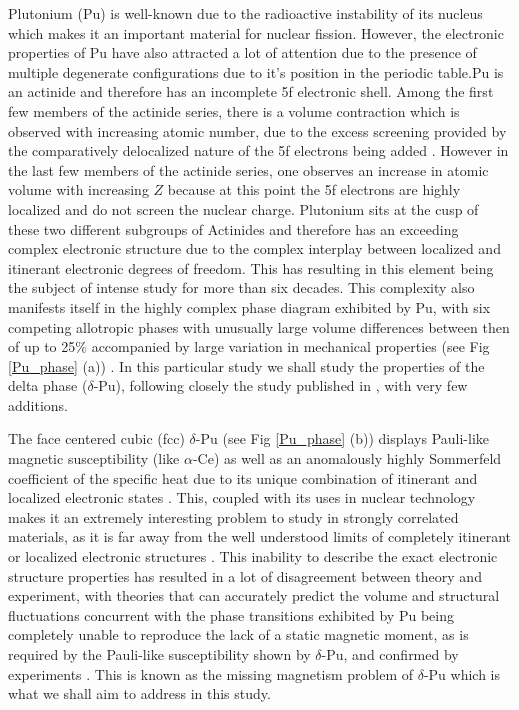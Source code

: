 \documentclass[10pt]{ruthesis}
\begin{document}
{Plutonium (Pu) is well-known due to the radioactive instability of its nucleus which makes it an important material for nuclear fission. However, the electronic properties of Pu have also attracted a lot of attention due to the presence of multiple degenerate configurations due to it's position in the periodic table.Pu is an actinide and therefore has an incomplete 5f electronic shell.  Among the first few members of the actinide series, there is a volume contraction which is observed with increasing atomic number, due to the excess screening provided by the comparatively delocalized nature of the 5f electrons being added . However in the last few members of the actinide series, one observes an increase in atomic volume with increasing $Z$ because at this point the 5f electrons are highly localized and do not screen the nuclear charge. Plutonium sits at the cusp of these two different subgroups of Actinides and therefore has an exceeding complex electronic structure due to the complex interplay between localized and itinerant electronic degrees of freedom. This has resulting in this element being the subject of intense study for more than six decades. This complexity also manifests itself in the highly complex phase diagram exhibited by Pu, with six competing allotropic phases with unusually large volume differences between then of up to 25$\%$ accompanied by large variation in mechanical properties (see Fig \ref{Pu_phase} (a)) . In this particular study we shall study the properties of the delta phase ($\delta$-Pu), following closely the study published in \cite{Me_Pu}, with very few additions. 


The face centered cubic (fcc) $\delta$-Pu (see Fig \ref{Pu_phase} (b)) displays Pauli-like magnetic susceptibility (like $\alpha$-Ce)  as well as an anomalously highly  Sommerfeld coefficient of the specific heat  due to its unique combination of itinerant and localized electronic states  \cite{Lashley1,Quint_1,Yang}. This, coupled with its uses in nuclear technology makes it an extremely interesting problem to study in strongly correlated materials, as it is far away from the well understood limits of completely itinerant or localized electronic structures . This inability to describe the exact electronic structure properties has resulted in a lot of disagreement between theory and experiment, with theories that can accurately predict the volume and structural fluctuations concurrent with the phase transitions exhibited by Pu being completely unable to reproduce the lack of a static magnetic moment, as is required by the Pauli-like susceptibility shown by $\delta$-Pu, and confirmed by experiments \cite{Pu_muon}. This is known as the missing magnetism problem of $\delta$-Pu which is what we shall aim to address in this study.

}
\end{document}
